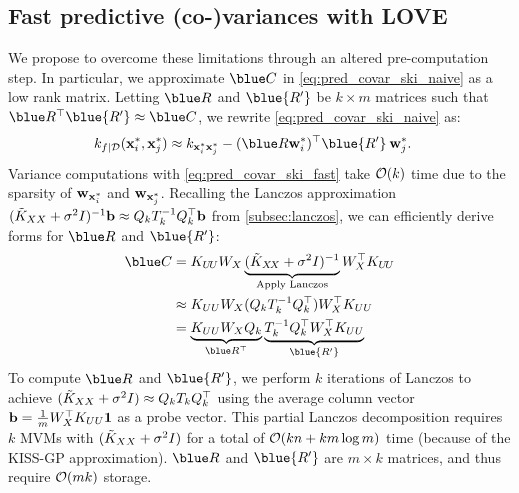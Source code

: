 \subsection{Fast predictive (co-)variances with LOVE{}}
We propose to overcome these limitations through an altered pre-computation step.
In particular, we approximate $\blue C$ in \eqref{eq:pred_covar_ski_naive} as a low rank matrix.
Letting $\blue R$ and $\blue{R'}$ be $k \times m$ matrices such that $\blue R^\top \blue{R'} \approx \blue C$, we rewrite \eqref{eq:pred_covar_ski_naive} as:
%
\begin{align}
  k_{f\mid\dset}(\bx^*_i, \bx^*_j) &\approx k_{\bx^{*}_i \bx^{*}_j} - (\blue R\bw^{*}_i )^{\top}\blue{R'} \: \bw^{*}_j.
    \label{eq:pred_covar_ski_fast}
\end{align}
%
Variance computations with \eqref{eq:pred_covar_ski_fast} take $\bigo{k}$ time
due to the sparsity of $\mathbf{w}_{\mathbf{x}^{*}_i}$ and $\mathbf{w}_{\mathbf{x}^{*}_j}$.
Recalling the Lanczos approximation
$
    (\tilde{K}_{XX} + \sigma^2 I)^{-1}\mathbf{b} \approx Q_{k}T^{-1}_{k}Q_{k}^{\top}\mathbf{b}
$
from \autoref{subsec:lanczos}, we can efficiently derive forms for $\blue R$ and $\blue{R'}$:
\begin{align*}
  \blue C &= \bK_{U \! U} W_{\bX} \underbrace{(\tilde{K}_{\bX\!\bX} + \sigma^2 \bI)^{-1}}_{\text{Apply Lanczos}} W^\top_{\bX} \bK_{U \! U} \\
         &\approx \bK_{UU} W_X (Q_k T_k^{-1} Q_k^\top) W_X^\top K_{UU} \\
         &= \underbrace{K_{UU} W_X Q_k}_{\blue R^\top} \underbrace{T_k^{-1} Q_k^\top W_X^\top \bK_{UU}}_{\blue{R'}}
\end{align*}
To compute $\blue R$ and $\blue{R'}$, we perform $k$ iterations of Lanczos to achieve $(\tilde{K}_{XX} + \sigma^2I)  \approx Q_{k}T_{k}Q_{k}^{\top}$ using the average column vector $\mathbf{b}=\frac{1}{m}W_X^\top K_{UU}\mathbf{1}$ as a probe vector.
This partial Lanczos decomposition requires $k$ MVMs with $(\tilde {K}_{XX} + \sigma^2 I)$ for a total of $\bigo{k n + k m \log m}$ time (because of the KISS-GP approximation).
$\blue R$ and $\blue{R'}$ are $m \times k$ matrices, and thus require $\bigo{mk}$ storage.


